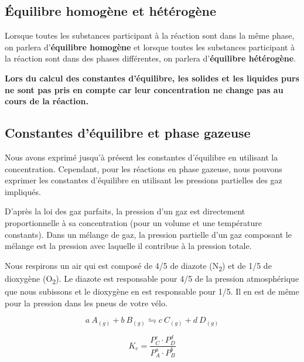 \documentclass[
  11pt,
  a4paper,
  openany]{book}
\begin{document}
\hypertarget{uxe9quilibre-homoguxe8ne-et-huxe9tuxe9roguxe8ne}{%
\subsection{Équilibre homogène et hétérogène}\label{uxe9quilibre-homoguxe8ne-et-huxe9tuxe9roguxe8ne}}

Lorsque toutes les substances participant à la réaction sont dans la même phase, on parlera d'\textbf{équilibre homogène} et lorsque toutes les substances participant à la réaction sont dans des phases différentes, on parlera d'\textbf{équilibre hétérogène}.

\textbf{Lors du calcul des constantes d'équilibre, les solides et les liquides purs ne sont pas pris en compte car leur concentration ne change pas au cours de la réaction.}

\hypertarget{constantes-duxe9quilibre-et-phase-gazeuse}{%
\subsection{Constantes d'équilibre et phase gazeuse}\label{constantes-duxe9quilibre-et-phase-gazeuse}}

Nous avons exprimé jusqu'à présent les constantes d'équilibre en utilisant la concentration. Cependant, pour les réactions en phase gazeuse, nous pouvons exprimer les constantes d'équilibre en utilisant les pressions partielles des gaz impliqués.

D'après la loi des gaz parfaits, la pression d'un gaz est directement proportionnelle à sa concentration (pour un volume et une température constants). Dans un mélange de gaz, la pression partielle d'un gaz composant le mélange est la pression avec laquelle il contribue à la pression totale.

Nous respirons un air qui est composé de 4/5 de diazote (N\textsubscript{2}) et de 1/5 de dioxygène (O\textsubscript{2}). Le diazote est responsable pour 4/5 de la pression atmosphérique que nous subissons et le dioxygène en est responsable pour 1/5. Il en est de même pour la pression dans les pneus de votre vélo.

\[
  a\ A_{(g)} + b\ B_{(g)} \leftrightharpoons c\ C_{(g)} + d\ D_{(g)}
\]

\[
  K_{e} = \frac{P_C^{c} \cdot P_D^{d}}{P_A^{a} \cdot P_B^{b}}
\]
\end{document}
